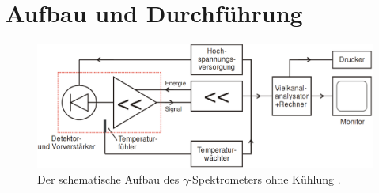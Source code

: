 \section{Aufbau und Durchführung}
\label{sec:Durchführung}

\begin{figure}
  \centering
  \includegraphics[width=\linewidth]{Bilder/Aufbau.png}
  \caption{Der schematische Aufbau des $\gamma$-Spektrometers ohne Kühlung \cite{V18}.}
  \label{fig:Aufbau}
\end{figure}
